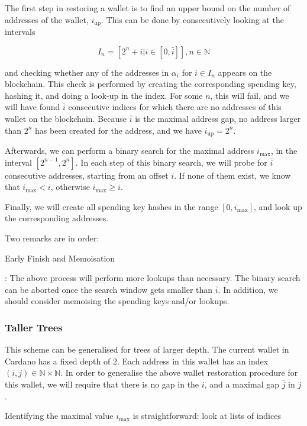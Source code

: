 \documentclass[11pt,a4paper]{article}
\begin{document}
The first step in restoring a wallet is to find an upper bound on the
number of addresses of the wallet, \(i_{\text{up}}\). This can be done
by consecutively looking at the intervals

\[
I_{n} = [2^n + i | i \in [0, \bar{i}]], n \in \mathbb{N}
\]

and checking whether any of the addresses in \(\alpha_i\) for
\(i \in I_{n}\) appears on the blockchain. This check is performed by
creating the corresponding spending key, hashing it, and doing a look-up
in the index. For some \(n\), this will fail, and we will have found
\(\bar{i}\) consecutive indices for which there are no addresses of this
wallet on the blockchain. Because \(\bar{i}\) is the maximal address
gap, no address larger than \(2^n\) has been created for the address,
and we have \(i_\text{up} = 2^n\).

Afterwards, we can perform a binary search for the maximal address
\(i_\text{max}\), in the interval \([2^{n-1}, 2^n]\). In each step of
this binary search, we will probe for \(\bar{i}\) consecutive addresses,
starting from an offset \(i\). If none of them exist, we know that
\(i_\text{max} < i\), otherwise \(i_\text{max} \geq i\).

Finally, we will create all spending key hashes in the range
\([0, i_\text{max}]\), and look up the corresponding addresses.

Two remarks are in order:

Early Finish and Memoisation

: The above process will perform more lookups than necessary. The binary
search can be aborted once the search window gets smaller than
\(\bar{i}\). In addition, we should consider memoising the spending keys
and/or lookups.

\subsubsection{Taller Trees}\label{taller-trees}

This scheme can be generalised for trees of larger depth. The current
wallet in Cardano has a fixed depth of 2. Each address in this wallet
has an index \((i, j) \in \mathbb{N} \times \mathbb{N}\). In order to
generalise the above wallet restoration procedure for this wallet, we
will require that there is no gap in the \(i\), and a maximal gap
\(\bar{j}\) in \(j\).

Identifying the maximal value \(i_\text{max}\) is straightforward: look
at lists of indices
\end{document}
